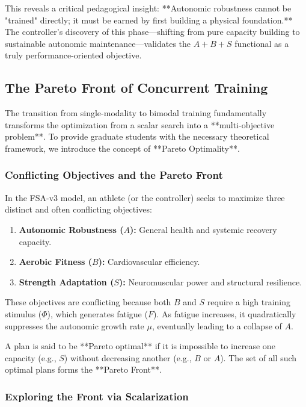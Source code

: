 This reveals a critical pedagogical insight: **Autonomic robustness cannot be "trained" directly; it must be earned by first building a physical foundation.** The controller's discovery of this phase—shifting from pure capacity building to sustainable autonomic maintenance—validates the $A+B+S$ functional as a truly performance-oriented objective.

\subsection{The Pareto Front of Concurrent Training}

The transition from single-modality to bimodal training fundamentally transforms the optimization from a scalar search into a **multi-objective problem**. To provide graduate students with the necessary theoretical framework, we introduce the concept of **Pareto Optimality**.

\subsubsection{Conflicting Objectives and the Pareto Front}

In the FSA-v3 model, an athlete (or the controller) seeks to maximize three distinct and often conflicting objectives:
\begin{enumerate}
    \item \textbf{Autonomic Robustness ($A$):} General health and systemic recovery capacity.
    \item \textbf{Aerobic Fitness ($B$):} Cardiovascular efficiency.
    \item \textbf{Strength Adaptation ($S$):} Neuromuscular power and structural resilience.
\end{enumerate}

These objectives are conflicting because both $B$ and $S$ require a high training stimulus ($\Phi$), which generates fatigue ($F$). As fatigue increases, it quadratically suppresses the autonomic growth rate $\mu$, eventually leading to a collapse of $A$. 

A plan is said to be **Pareto optimal** if it is impossible to increase one capacity (e.g., $S$) without decreasing another (e.g., $B$ or $A$). The set of all such optimal plans forms the **Pareto Front**.

\subsubsection{Exploring the Front via Scalarization}

